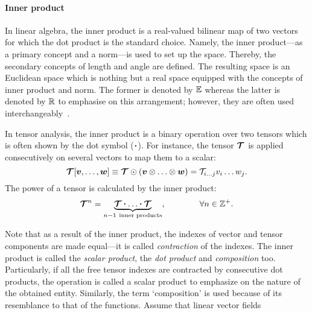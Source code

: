     \paragraph{Inner product} In linear algebra, the inner product is a real-valued bilinear map of two vectors for which the dot product is the standard choice. Namely, the inner product---as a primary concept and a norm---is used to set up the space. Thereby, the secondary concepts of length and angle are defined. The resulting space is an Euclidean space which is nothing but a real space equipped with the concepts of inner product and norm. The former is denoted by $\mathbb{E}$ whereas the latter is denoted by $\mathbb{R}$ to emphasise on this arrangement; however, they are often used interchangeably~\autocite{Tadmor.2012,Grinfeld.2013}.

    \begin{definition}
        In tensor analysis, the inner product is a binary operation over two tensors which is often shown by the dot symbol ($\scp$). For instance, the tensor $\mathord{\mbox{\boldmath$\mathcal{T}$}}$ is applied consecutively on several vectors to map them to a scalar:
        \begin{equation}\label{eq:contr}
            \ten{T}[\tena{v},\ldots,\tena{w}] \equiv \ten{T} \odot (\tena{v} \dyad  \ldots \dyad \tena{w})=\mathcal{T}_{i\ldots j}v_{i} \ldots w_j.
        \end{equation}
        The power of a tensor is calculated by the inner product:
        \begin{equation}
        \ten{T}^n=\underbrace{\ten{T}\scp\ldots\scp\ten{T}}_{n-1\ \text{inner products}},\qquad\qquad\forall n\in\Integer^+.
        \end{equation}
    \end{definition} 
    Note that as a result of the inner product, the indexes of vector and tensor components are made equal---it is called \textit{contraction} of the indexes. The inner product is called the \textit{scalar product}, the \textit{dot product} and \textit{composition} too. Particularly, if all the free tensor indexes are contracted by consecutive dot products, the operation is called a scalar product to emphasize on the nature of the obtained entity. Similarly, the term `composition' is used because of its resemblance to that of the functions. Assume that linear vector fields
